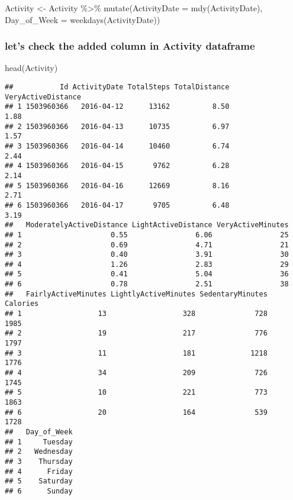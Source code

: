\documentclass[
]{article}
\newenvironment{Shaded}{\begin{snugshade}}{\end{snugshade}}
\newcommand{\AttributeTok}[1]{\textcolor[rgb]{0.77,0.63,0.00}{#1}}
\newcommand{\FunctionTok}[1]{\textcolor[rgb]{0.00,0.00,0.00}{#1}}
\newcommand{\NormalTok}[1]{#1}
\newcommand{\OtherTok}[1]{\textcolor[rgb]{0.56,0.35,0.01}{#1}}
\newcommand{\SpecialCharTok}[1]{\textcolor[rgb]{0.00,0.00,0.00}{#1}}
\begin{document}
\begin{Shaded}
\begin{Highlighting}[]
\NormalTok{Activity }\OtherTok{\textless{}{-}}\NormalTok{ Activity }\SpecialCharTok{\%\textgreater{}\%}
\FunctionTok{mutate}\NormalTok{(}\AttributeTok{ActivityDate =} \FunctionTok{mdy}\NormalTok{(ActivityDate), }\AttributeTok{Day\_of\_Week =} \FunctionTok{weekdays}\NormalTok{(ActivityDate))}
\end{Highlighting}
\end{Shaded}

\hypertarget{lets-check-the-added-column-in-activity-dataframe}{%
\subsubsection{let's check the added column in Activity
dataframe}\label{lets-check-the-added-column-in-activity-dataframe}}

\begin{Shaded}
\begin{Highlighting}[]
\FunctionTok{head}\NormalTok{(Activity)}
\end{Highlighting}
\end{Shaded}

\begin{verbatim}
##           Id ActivityDate TotalSteps TotalDistance VeryActiveDistance
## 1 1503960366   2016-04-12      13162          8.50               1.88
## 2 1503960366   2016-04-13      10735          6.97               1.57
## 3 1503960366   2016-04-14      10460          6.74               2.44
## 4 1503960366   2016-04-15       9762          6.28               2.14
## 5 1503960366   2016-04-16      12669          8.16               2.71
## 6 1503960366   2016-04-17       9705          6.48               3.19
##   ModeratelyActiveDistance LightActiveDistance VeryActiveMinutes
## 1                     0.55                6.06                25
## 2                     0.69                4.71                21
## 3                     0.40                3.91                30
## 4                     1.26                2.83                29
## 5                     0.41                5.04                36
## 6                     0.78                2.51                38
##   FairlyActiveMinutes LightlyActiveMinutes SedentaryMinutes Calories
## 1                  13                  328              728     1985
## 2                  19                  217              776     1797
## 3                  11                  181             1218     1776
## 4                  34                  209              726     1745
## 5                  10                  221              773     1863
## 6                  20                  164              539     1728
##   Day_of_Week
## 1     Tuesday
## 2   Wednesday
## 3    Thursday
## 4      Friday
## 5    Saturday
## 6      Sunday
\end{verbatim}
\end{document}
